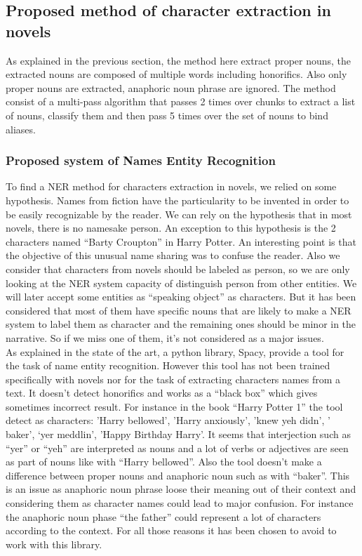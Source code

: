 \documentclass[a4paper, 12pt]{report}
\begin{document}
\subsection{Proposed method of character extraction in novels}
As explained in the previous section, the method here extract proper nouns, the extracted nouns are composed of multiple words including honorifics. Also only proper nouns are extracted, anaphoric noun phrase are ignored. The method consist of a multi-pass algorithm that passes 2 times over chunks to extract a list of nouns, classify them and then pass 5 times over the set of nouns to bind aliases.
\subsubsection{Proposed system of Names Entity Recognition}
\label{section:NER}
To find a NER method for characters extraction in novels, we relied on some hypothesis. Names from fiction have the particularity to be invented in order to be easily recognizable by the reader. We can rely on the hypothesis that in most novels, there is no namesake person. An exception to this hypothesis is the 2 characters named ``Barty Croupton'' in Harry Potter. An interesting point is that the objective of this unusual name sharing was to confuse the reader. Also we consider that characters from novels should be labeled as person, so we are only looking at the  NER system capacity of distinguish person from other entities. We will later accept some entities as ``speaking object'' as characters. But it has been considered that most of them have specific nouns that are likely to make a NER system to label them as character and the remaining ones should be minor in the narrative. So if we miss one of them, it's not considered as a major issues.\\

As explained in the state of the art, a  python library, Spacy, provide a tool for the task of name entity recognition. However this tool has not been trained specifically with novels nor for the task of extracting characters names from a text. It doesn't detect honorifics and works as a ``black box'' which gives sometimes incorrect result. For instance in the book ``Harry Potter 1'' the tool detect as characters: 'Harry bellowed', 'Harry anxiously', 'knew yeh didn', ' baker', `yer meddlin', 'Happy Birthday Harry'. It seems that interjection such as ``yer'' or ``yeh'' are interpreted as nouns and  a lot of verbs or adjectives are seen as part of nouns like with ``Harry bellowed''. Also the tool doesn't make a difference between proper nouns and anaphoric noun such as with ``baker''. This is an issue as anaphoric noun phrase loose their meaning out of their context and considering them as character names could lead to major confusion. For instance the anaphoric noun phase ``the father'' could represent a lot of characters according to the context. For all those reasons it has been chosen to avoid to work with this library. \\
\end{document}
